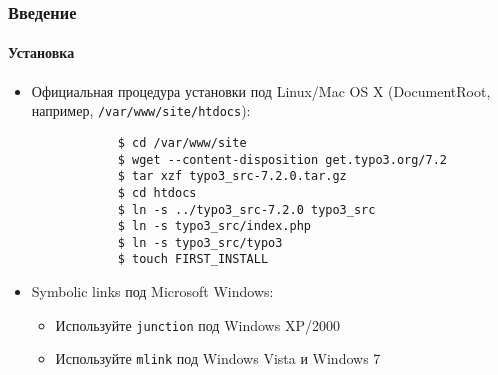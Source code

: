 \begin{frame}[fragile]
	\frametitle{Введение}
	\framesubtitle{Установка}

	\begin{itemize}
		\item Официальная процедура установки под Linux/Mac OS X\newline
			(DocumentRoot, например, \texttt{/var/www/site/htdocs}):
		\begin{lstlisting}
			$ cd /var/www/site
			$ wget --content-disposition get.typo3.org/7.2
			$ tar xzf typo3_src-7.2.0.tar.gz
			$ cd htdocs
			$ ln -s ../typo3_src-7.2.0 typo3_src
			$ ln -s typo3_src/index.php
			$ ln -s typo3_src/typo3
			$ touch FIRST_INSTALL
		\end{lstlisting}

		\item Symbolic links под Microsoft Windows:

			\begin{itemize}
				\item Используйте \texttt{junction} под Windows XP/2000
				\item Используйте \texttt{mlink} под Windows Vista и Windows 7
			\end{itemize}

	\end{itemize}
\end{frame}

